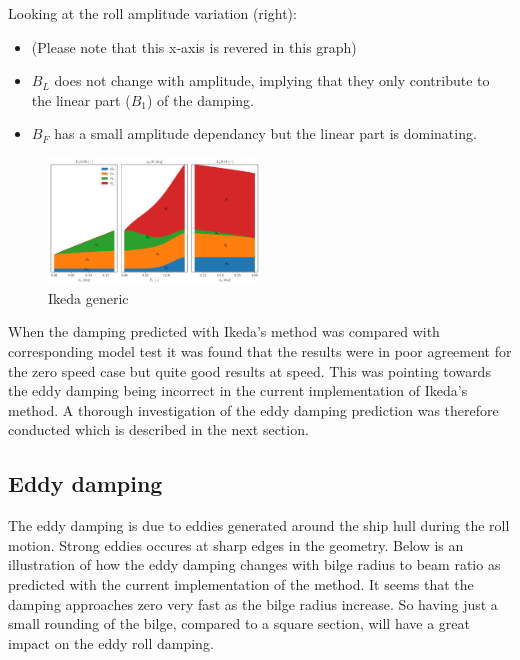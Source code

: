 Looking at the roll amplitude variation (right):

\begin{itemize}
\item (Please note that this x-axis is revered in this graph)
\item $B_L$ does not change with amplitude, implying that they only contribute to the linear part ($B_1$) of the damping.
\item $B_F$ has a small amplitude dependancy but the linear part is dominating.
\end{itemize}

    \begin{figure}[H]
        \begin{center}\includegraphics[width = 0.5\textwidth]{figures/ikeda_generic.pdf}\end{center}
        \vspace{-1cm}
        \caption{Ikeda generic}
        \label{fig:ikeda_generic}
    \end{figure}
    
    When the damping predicted with Ikeda's method was compared with
corresponding model test it was found that the results were in poor
agreement for the zero speed case but quite good results at speed. This
was pointing towards the eddy damping being incorrect in the current
implementation of Ikeda's method. A thorough investigation of the eddy
damping prediction was therefore conducted which is described in the
next section.

    \subsection{Eddy damping}\label{eddy-damping}

The eddy damping is due to eddies generated around the ship hull during
the roll motion. Strong eddies occures at sharp edges in the geometry.
Below is an illustration of how the eddy damping changes with bilge
radius to beam ratio as predicted with the current implementation of the
method. It seems that the damping approaches zero very fast as the bilge
radius increase. So having just a small rounding of the bilge, compared
to a square section, will have a great impact on the eddy roll damping.

